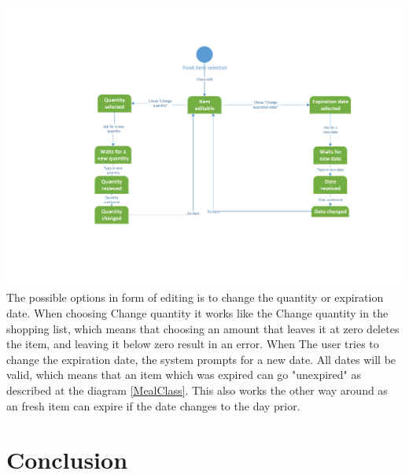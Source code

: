 \includegraphics[width=1.0\textwidth]{ApplicationDomain/spEditInventory.pdf} \label{spEditInventory}
The possible options in form of editing is to change the quantity or expiration date. 
When choosing Change quantity it works like the Change quantity in the shopping list, which means that choosing an amount that leaves it at zero deletes the item, and leaving it below zero result in an error. When The user tries to change the expiration date, the system prompts for a new date. All dates will be valid, which means that an item which was expired can go "unexpired" as described at the diagram \ref{MealClass}. This also works the other way around as an fresh item can expire if the date changes to the day prior.


\section{Conclusion}